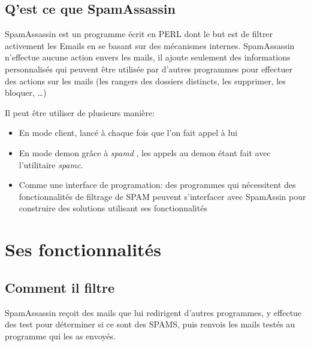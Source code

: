 \documentclass[a4paper,11pt]{article}
\begin{document}
\subsection{Q'est ce que SpamAssassin}

SpamAssassin est un programme écrit en PERL dont le but est de filtrer activement les Emails en se basant sur des mécanismes internes. 
SpamAssassin n'effectue aucune action envers les mails, il ajoute seulement des informations personnalisés
qui peuvent être utilisée par d'autres programmes pour effectuer des actions sur les mails (les rangers des dossiers distincts, les supprimer, les bloquer, \dots)


Il peut être utiliser de plusieurs manière:
\begin{itemize}
 \item En mode client, lancé à chaque fois que l'on fait appel à lui
 \item En mode demon grâce à \emph{spamd} , les appels au demon étant fait avec l'utilitaire \emph{spamc}.
 \item Comme une interface de programation: des programmes qui nécessitent des fonctionnalités de filtrage de SPAM peuvent s'interfacer avec SpamAssin
 pour construire des solutions utilisant ses fonctionnalités
\end{itemize}

\pagebreak

\section{Ses fonctionnalités}

\subsection{Comment il filtre}

SpamAssassin reçoit des mails que lui redirigent d'autres programmes, y effectue des test pour déterminer si ce sont des SPAMS, 
puis renvois les mails testés au programme qui les as envoyés.
\end{document}
